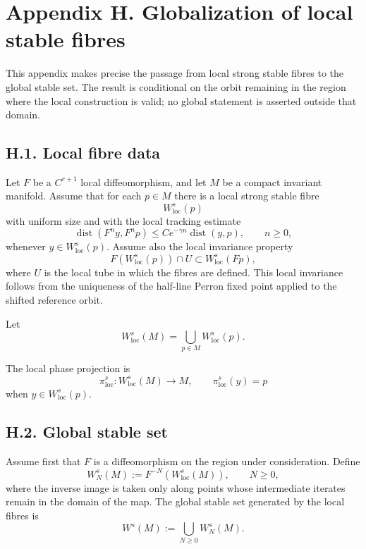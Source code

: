 \documentclass[12pt,a4paper]{article}
\theoremstyle{plain}
\numberwithin{equation}{section}
\numberwithin{theorem}{section}
\begin{document}
\clearpage

\section{Appendix H. Globalization of local stable fibres}

This appendix makes precise the passage from local strong stable fibres to the global stable set. The result is conditional on the orbit remaining in the region where the local construction is valid; no global statement is asserted outside that domain.

\subsection{H.1. Local fibre data}

Let $F$ be a $C^{r+1}$ local diffeomorphism, and let $M$ be a compact invariant manifold. Assume that for each $p\in M$ there is a local strong stable fibre
\[
W^s_{\mathrm{loc}}(p)
\]
with uniform size and with the local tracking estimate
\[
\operatorname{dist}(F^n y,F^n p)
\le
C e^{-\gamma n}\operatorname{dist}(y,p),
\qquad n\ge0,
\]
whenever $y\in W^s_{\mathrm{loc}}(p)$. Assume also the local invariance property
\[
F(W^s_{\mathrm{loc}}(p))
\cap U
\subset
W^s_{\mathrm{loc}}(Fp),
\]
where $U$ is the local tube in which the fibres are defined. This local invariance follows from the uniqueness of the half-line Perron fixed point applied to the shifted reference orbit.

Let
\[
W^s_{\mathrm{loc}}(M)=
\bigcup_{p\in M}W^s_{\mathrm{loc}}(p).
\]

The local phase projection is
\[
\pi^s_{\mathrm{loc}}:W^s_{\mathrm{loc}}(M)\to M,
\qquad
\pi^s_{\mathrm{loc}}(y)=p
\]
when $y\in W^s_{\mathrm{loc}}(p)$.

\subsection{H.2. Global stable set}

Assume first that $F$ is a diffeomorphism on the region under consideration. Define
\[
W_N^s(M):=F^{-N}(W^s_{\mathrm{loc}}(M)),
\qquad N\ge0,
\]
where the inverse image is taken only along points whose intermediate iterates remain in the domain of the map. The global stable set generated by the local fibres is
\[
W^s(M):=
\bigcup_{N\ge0} W_N^s(M).
\]
\end{document}
